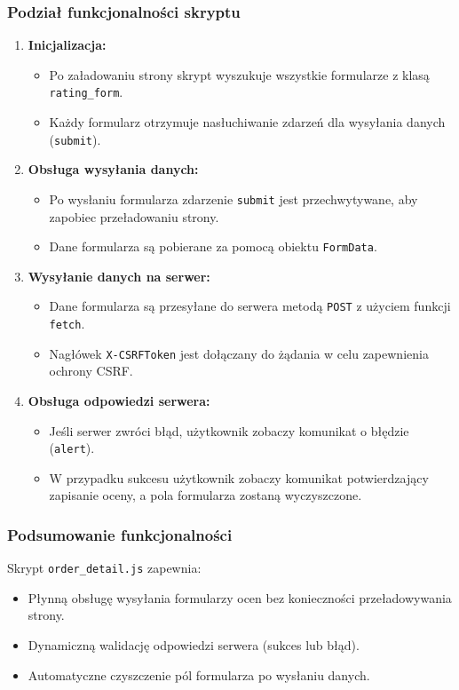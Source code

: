 \documentclass[12pt,a4paper,oneside]{article}
\theoremstyle{definition}
\numberwithin{equation}{section}
\begin{document}
\subsubsection*{Podział funkcjonalności skryptu}
\begin{enumerate}
    \item \textbf{Inicjalizacja:}
    \begin{itemize}
        \item Po załadowaniu strony skrypt wyszukuje wszystkie formularze z klasą \texttt{rating\_form}.
        \item Każdy formularz otrzymuje nasłuchiwanie zdarzeń dla wysyłania danych (\texttt{submit}).
    \end{itemize}

    \item \textbf{Obsługa wysyłania danych:}
    \begin{itemize}
        \item Po wysłaniu formularza zdarzenie \texttt{submit} jest przechwytywane, aby zapobiec przeładowaniu strony.
        \item Dane formularza są pobierane za pomocą obiektu \texttt{FormData}.
    \end{itemize}

    \item \textbf{Wysyłanie danych na serwer:}
    \begin{itemize}
        \item Dane formularza są przesyłane do serwera metodą \texttt{POST} z użyciem funkcji \texttt{fetch}.
        \item Nagłówek \texttt{X-CSRFToken} jest dołączany do żądania w celu zapewnienia ochrony CSRF.
    \end{itemize}

    \item \textbf{Obsługa odpowiedzi serwera:}
    \begin{itemize}
        \item Jeśli serwer zwróci błąd, użytkownik zobaczy komunikat o błędzie (\texttt{alert}).
        \item W przypadku sukcesu użytkownik zobaczy komunikat potwierdzający zapisanie oceny, a pola formularza zostaną wyczyszczone.
    \end{itemize}
\end{enumerate}

\subsubsection*{Podsumowanie funkcjonalności}
Skrypt \texttt{order\_detail.js} zapewnia:
\begin{itemize}
    \item Płynną obsługę wysyłania formularzy ocen bez konieczności przeładowywania strony.
    \item Dynamiczną walidację odpowiedzi serwera (sukces lub błąd).
    \item Automatyczne czyszczenie pól formularza po wysłaniu danych.
\end{itemize}
\end{document}

